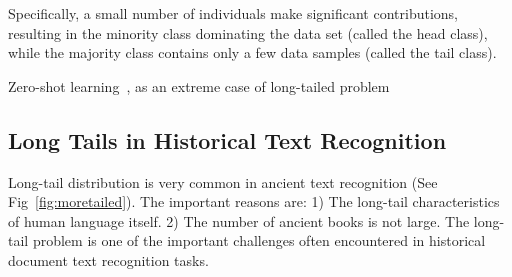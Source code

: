 Specifically, a small number of individuals make significant contributions, resulting in the minority class dominating the data set (called the head class), while the majority class contains only a few data samples (called the tail class). 


Zero-shot learning~\cite{gzsl-survey}, as an extreme case of long-tailed problem


\subsection{Long Tails in Historical Text Recognition}

Long-tail distribution is very common in ancient text recognition (See Fig~\ref{fig:moretailed}). 
The important reasons are: 1) The long-tail characteristics of human language itself. 2) The number of ancient books is not large. The long-tail problem is one of the important challenges often encountered in historical document text recognition tasks.